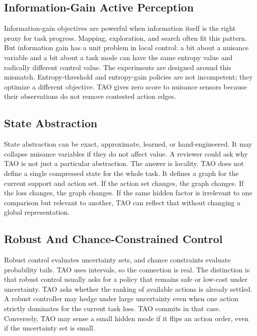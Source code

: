 \documentclass{article}
\begin{document}
\subsection{Information-Gain Active Perception}

Information-gain objectives are powerful when information itself is the right proxy for task progress. Mapping, exploration, and search often fit this pattern. But information gain has a unit problem in local control: a bit about a nuisance variable and a bit about a task mode can have the same entropy value and radically different control value. The experiments are designed around this mismatch. Entropy-threshold and entropy-gain policies are not incompetent; they optimize a different objective. TAO gives zero score to nuisance sensors because their observations do not remove contested action edges.

\subsection{State Abstraction}

State abstraction can be exact, approximate, learned, or hand-engineered. It may collapse nuisance variables if they do not affect value. A reviewer could ask why TAO is not just a particular abstraction. The answer is locality. TAO does not define a single compressed state for the whole task. It defines a graph for the current support and action set. If the action set changes, the graph changes. If the loss changes, the graph changes. If the same hidden factor is irrelevant to one comparison but relevant to another, TAO can reflect that without changing a global representation.

\subsection{Robust And Chance-Constrained Control}

Robust control evaluates uncertainty sets, and chance constraints evaluate probability tails. TAO uses intervals, so the connection is real. The distinction is that robust control usually asks for a policy that remains safe or low-cost under uncertainty. TAO asks whether the ranking of available actions is already settled. A robust controller may hedge under large uncertainty even when one action strictly dominates for the current task loss. TAO commits in that case. Conversely, TAO may sense a small hidden mode if it flips an action order, even if the uncertainty set is small.
\end{document}
